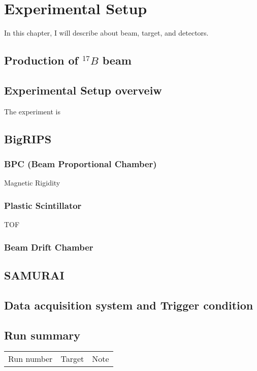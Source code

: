 \chapter{Experimental Setup}
In this chapter, I will describe about beam, target, and detectors. 
\section{Production of  ${}^{17}B$ beam}

\section{Experimental Setup overveiw}
The experiment is 
\section{BigRIPS}
\subsection{BPC (Beam Proportional Chamber)}
Magnetic Rigidity 
\subsection{Plastic Scintillator}
TOF
\subsection{Beam Drift Chamber}


\section{SAMURAI}
\section{Data acquisition system and Trigger condition}
\section{Run summary}
\begin{tabular}[h]{c|c|c}
    \hline
    Run number& Target & Note \\    
\end{tabular}